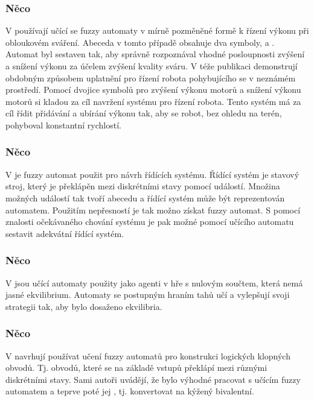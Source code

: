 \documentclass[a4paper,10pt]{article}
\begin{document}
\subsubsection{Něco}
V \cite{TzaRig-StaAnaAdaFuzzConSysUsiPetrNetLeaAut} používají učící se fuzzy automaty v mírně pozměněné formě k řízení výkonu při obloukovém sváření. Abeceda v tomto případě obsahuje dva symboly,  a . Automat byl sestaven tak, aby správně rozpoznával vhodné posloupnosti zvýšení a snížení výkonu za účelem zvýšení kvality sváru. V téže publikaci demonstrují obdobným způsobem uplatnění pro řízení robota pohybujícího se v neznámém prostředí. Pomocí dvojice symbolů pro zvýšení výkonu motorů a snížení výkonu motorů si kladou za cíl navržení systému pro řízení robota. Tento systém má za cíl řídit přidávání a ubírání výkonu tak, aby se robot, bez ohledu na terén, pohyboval konstantní rychlostí.

\subsubsection{Něco}
V \cite{WeeFu-FormFuzAutAppModLeaSys} je fuzzy automat použit pro návrh řídících systému. Řídící systém je stavový stroj, který je překlápěn mezi diskrétními stavy pomocí událostí. Množina možných událostí tak tvoří abecedu a řídící systém může být reprezentován automatem. Použitím nepřesností je tak možno získat fuzzy automat.  S pomocí znalosti očekávaného chování systému je pak možné pomocí učícího automatu sestavit adekvátní řídící systém.

\subsubsection{Něco}
V \cite{FuLi-ForLeaAutAutGam} jsou učící automaty použity jako agenti v hře s nulovým součtem, která nemá jasné ekvilibrium. Automaty se postupným hraním tahů učí a vylepšují svoji strategii tak, aby bylo dosaženo ekvilibria.

\subsubsection{Něco}
V \cite{PedGac-LeaFuzzAut} navrhují používat učení fuzzy automatů pro konstrukci logických klopných obvodů. Tj. obvodů, které se na základě vstupů překlápí mezi různými diskrétními stavy. Sami autoři uvádějí, že bylo výhodné pracovat s učícím fuzzy automatem a teprve poté jej , tj. konvertovat na kýžený bivalentní.
\end{document}
